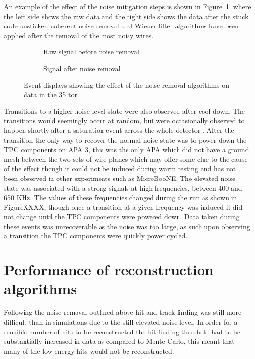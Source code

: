 An example of the effect of the noise mitigation steps is shown in Figure~\ref{fig:NoiseRemoval}, where the left side shows the raw data and the right side shows the data after the stuck code unsticker, coherent noise removal and Wiener filter algorithms have been applied after the removal of the most noisy wires. \\

\begin{figure}[h!]
  \centering
  \begin{subfigure}{0.45\textwidth}
    \centering
    \caption{Raw signal before noise removal}
  \end{subfigure}
  \hspace{0.08\textwidth}
  \begin{subfigure}{0.45\textwidth}
    \centering
    \caption{Signal after noise removal}
  \end{subfigure}
  \caption[The effect of noise removal algorithms in the 35 ton]{Event displays showing the effect of the noise removal algorithms on data in the 35 ton.}
  \label{fig:NoiseRemoval}
\end{figure}

Transitions to a higher noise level state were also observed after cool down. The transitions would seemingly occur at random, but were occasionally observed to happen shortly after a saturation event across the whole detector \citep{35tonNoiseMeeting}. After the transition the only way to recover the normal noise state was to power down the TPC components on APA 3, this was the only APA which did not have a ground mesh between the two sets of wire planes which may offer some clue to the cause of the effect though it could not be induced during warm testing and has not been observed in other experiments such as MicroBooNE. The elevated noise state was associated with a strong signals at high frequencies, between 400 and 650 KHz. The values of these frequencies changed during the run as shown in FigureXXXX, though once a transition at a given frequency was induced it did not change until the TPC components were powered down. Data taken during these events was unrecoverable as the noise was too large, as such upon observing a transition the TPC components were quickly power cycled. 

\section{Performance of reconstruction algorithms} \label{sec:DataAlgs}  %
Following the noise removal outlined above hit and track finding was still more difficult than in simulations due to the still elevated noise level. In order for a sensible number of hits to be reconstructed the hit finding threshold had to be substantially increased in data as compared to Monte Carlo, this meant that many of the low energy hits would not be reconstructed. \\

